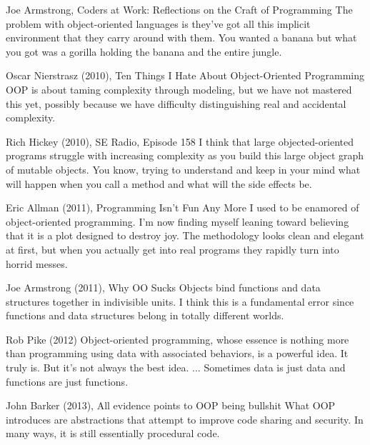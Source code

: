 \documentclass[12pt]{KodeBookAr}
\begin{document}
\begin{kodequote}{Joe Armstrong, Coders at Work: Reflections on the Craft of Programming}
	The problem with object-oriented languages is they've got all this implicit environment that they carry around with them. 
	You wanted a banana but what you got was a gorilla holding the banana and the entire jungle.
\end{kodequote}

\begin{kodequote}{Oscar Nierstrasz (2010), Ten Things I Hate About Object-Oriented Programming}
	OOP is about taming complexity through modeling, but we have not mastered this yet, possibly because we have difficulty distinguishing real and accidental complexity.
\end{kodequote}

\begin{kodequote}{Rich Hickey (2010), SE Radio, Episode 158}
	I think that large objected-oriented programs struggle with increasing complexity as you build this large object graph of mutable objects. You know, trying to understand and keep in your mind what will happen when you call a method and what will the side effects be.
\end{kodequote}

\begin{kodequote}{Eric Allman (2011), Programming Isn't Fun Any More}
	I used to be enamored of object-oriented programming. I'm now finding myself leaning toward believing that it is a plot designed to destroy joy. The methodology looks clean and elegant at first, but when you actually get into real programs they rapidly turn into horrid messes.
\end{kodequote}

\begin{kodequote}{Joe Armstrong (2011), Why OO Sucks}
	Objects bind functions and data structures together in indivisible units. I think this is a fundamental error since functions and data structures belong in totally different worlds.
\end{kodequote}

\begin{kodequote}{Rob Pike (2012)}
	Object-oriented programming, whose essence is nothing more than programming using data with associated behaviors, is a powerful idea. It truly is. But it's not always the best idea. ... Sometimes data is just data and functions are just functions.
\end{kodequote}

\begin{kodequote}{John Barker (2013), All evidence points to OOP being bullshit}
	What OOP introduces are abstractions that attempt to improve code sharing and security. In many ways, it is still essentially procedural code.
\end{kodequote}
\end{document}
